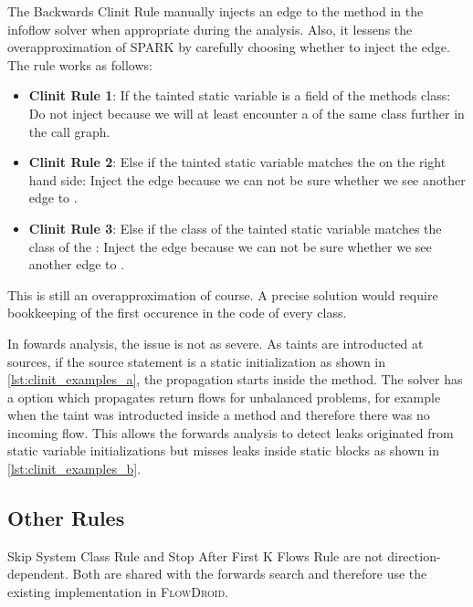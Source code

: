 \documentclass[../draft.tex]{subfiles}
\begin{document}
    The Backwards Clinit Rule manually injects an edge to the  method in the infoflow solver when appropriate during the analysis. Also, it lessens the overapproximation of SPARK by carefully choosing whether to inject the edge. The rule works as follows:
    \begin{itemize}
        \item \textbf{Clinit Rule 1}: If the tainted static variable is a field of the methods class: Do not inject because we will at least encounter a  of the same class further in the call graph.
        \item \textbf{Clinit Rule 2}: Else if the tainted static variable matches the  on the right hand side: Inject the edge because we can not be sure whether we see another edge to .
        \item \textbf{Clinit Rule 3}: Else if the class of the tainted static variable matches the class of the : Inject the edge because we can not be sure whether we see another edge to .
    \end{itemize}
    This is still an overapproximation of course. A precise solution would require bookkeeping of the first occurence in the code of every class. 

    In fowards analysis, the issue is not as severe. As taints are introducted at sources, if the source statement is a static initialization as shown in \autoref{lst:clinit_examples_a}, the propagation starts inside the  method. The solver has a  option which propagates return flows for unbalanced problems, for example when the taint was introducted inside a method and therefore there was no incoming flow. This allows the forwards analysis to detect leaks originated from static variable initializations but misses leaks inside static blocks as shown in \autoref{lst:clinit_examples_b}.

    \subsection{Other Rules}
    Skip System Class Rule and Stop After First K Flows Rule are not direction-dependent. Both are shared with the forwards search and therefore use the existing implementation in \textsc{FlowDroid}.
    
\end{document}
